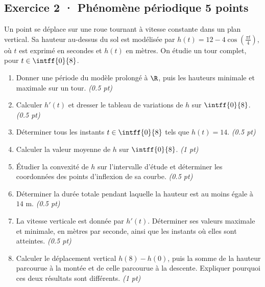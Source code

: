 \subsection*{Exercice 2 · Phénomène périodique \hfill 5 points}Un point se déplace sur une roue tournant à vitesse constante dans un plan vertical. Sa hauteur au-dessus du sol est modélisée par $h(t)=12-4\cos\left(\frac{\pi t}{4}\right)$, où $t$ est exprimé en secondes et $h(t)$ en mètres. On étudie un tour complet, pour $t\in\intff{0}{8}$.

\begin{enumerate}

\item Donner une période du modèle prolongé à $\R$, puis les hauteurs minimale et maximale sur un tour. \hfill\textit{(\num{0,5} pt)}

\item Calculer $h'(t)$ et dresser le tableau de variations de $h$ sur $\intff{0}{8}$. \hfill\textit{(\num{0,5} pt)}

\item Déterminer tous les instants $t\in\intff{0}{8}$ tels que $h(t)=14$. \hfill\textit{(\num{0,5} pt)}

\item Calculer la valeur moyenne de $h$ sur $\intff{0}{8}$. \hfill\textit{(1 pt)}

\item Étudier la convexité de $h$ sur l'intervalle d'étude et déterminer les coordonnées des points d'inflexion de sa courbe. \hfill\textit{(\num{0,5} pt)}

\item Déterminer la durée totale pendant laquelle la hauteur est au moins égale à $14$ m. \hfill\textit{(\num{0,5} pt)}

\item La vitesse verticale est donnée par $h'(t)$. Déterminer ses valeurs maximale et minimale, en mètres par seconde, ainsi que les instants où elles sont atteintes. \hfill\textit{(\num{0,5} pt)}

\item Calculer le déplacement vertical $h(8)-h(0)$, puis la somme de la hauteur parcourue à la montée et de celle parcourue à la descente. Expliquer pourquoi ces deux résultats sont différents. \hfill\textit{(1 pt)}

\end{enumerate}

\mxnewpage{}

